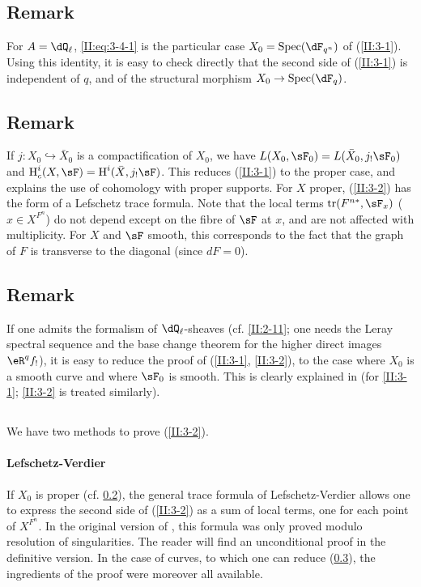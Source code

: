 \subsection{Remark}\label{II:3-5}

For $A=\dQ_\ell$, \eqref{II:eq:3-4-1} is the particular case
$X_0=\spec(\dF_{q^n})$ of (\ref{II:3-1}). Using this identity, it is
easy to check directly that the second side of (\ref{II:3-1}) is
independent of $q$, and of the structural morphism $X_0\to\spec(\dF_q)$.




\subsection{Remark}\label{II:3-6}

If $j:X_0\hookrightarrow \bar X_0$ is a compactification of $X_0$, we have
$L(X_0,\sF_0) = L(\bar X_0, j_!\sF_0)$ and
$\h_c^i(X,\sF) = \h^i(\bar X,j_!\sF)$. This reduces (\ref{II:3-1}) to the
proper case, and explains the use of cohomology with proper supports. For $X$
proper, (\ref{II:3-2}) has the form of a Lefschetz trace formula. Note
that the local terms $\tr(F^{n *},\sF_x)$ ($x\in X^{F^n}$) do not
depend except on the fibre of $\sF$ at $x$, and are not affected with
multiplicity. For $X$ and $\sF$ smooth, this corresponds to the fact that the graph
of $F$ is transverse to the diagonal (since $d F = 0$).




\subsection{Remark}\label{II:3-7}

If one admits the formalism of $\dQ_\ell$-sheaves (cf. \ref{II:2-11}; one needs
the Leray spectral sequence and the base change theorem for the higher direct images
$\eR^q f_!$), it is easy to reduce the proof of (\ref{II:3-1}, \ref{II:3-2}), to the case where $X_0$ is
a smooth curve and where $\sF_0$ is smooth. This is clearly explained
in \cite[\S 5]{gr95} (for \ref{II:3-1}; \ref{II:3-2} is treated similarly).




\subsection{}\label{II:3-8}

We have two methods to prove (\ref{II:3-2}).


\paragraph{Lefschetz-Verdier}
If $X_0$ is proper (cf. \ref{II:3-6}), the general trace formula of
Lefschetz-Verdier allows one to express the second side of (\ref{II:3-2}) as
a sum of local terms, one for each point of $X^{F^n}$. In the original
version of \cite{sga5}, this formula was only proved modulo
resolution of singularities. The reader will find an unconditional proof
in the definitive version. In the case of curves, to which one can reduce
(\ref{II:3-7}), the ingredients of the proof were
moreover all available.

